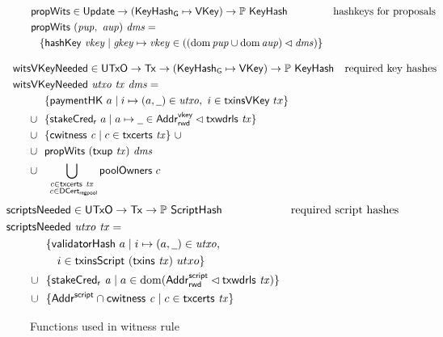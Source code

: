 \begin{figure}[htb]
  \begin{align*}
    & \mathsf{propWits} \in \mathsf{Update} \to (\mathsf{KeyHash_G}\mapsto\mathsf{VKey}) \to \mathbb{P}~\mathsf{KeyHash}
    & \text{hashkeys for proposals} \\
    & \mathsf{propWits}~(\mathit{pup},~\mathit{aup})~\mathit{dms} = \\
    & ~~\left\{
      \mathsf{hashKey}~ \mathit{vkey}
      \mid
      \mathit{gkey}\mapsto\mathit{vkey}\in
      \left(\left(\operatorname{dom}{\mathit{pup}}\cup\operatorname{dom}{\mathit{aup}}\right)\lhd\mathit{dms}\right)
      \right\}
  \end{align*}

    \begin{align*}
    & \hspace{-0.8cm}\fun{witsVKeyNeeded} \in \UTxO \to \Tx \to (\KeyHashGen\mapsto\VKey) \to
      \powerset{\KeyHash}
    & \text{required key hashes} \\
    &  \hspace{-0.8cm}\fun{witsVKeyNeeded}~\var{utxo}~\var{tx}~\var{dms} = \\
    & ~~\{ \fun{paymentHK}~a \mid i \mapsto (a, \wcard) \in \var{utxo},~i\in\fun{txinsVKey}~{tx} \} \\
    \cup & ~~
           \{\fun{stakeCred_r}~a\mid a\mapsto \wcard \in \AddrRWDVKey
      \restrictdom \txwdrls{tx}\}\\
    \cup & ~~\{\cwitness{c} \mid c \in \txcerts{tx}\}~\cup \\
    \cup & ~~\fun{propWits}~(\fun{txup}~\var{tx})~\var{dms} \\
    \cup & ~~\bigcup_{\substack{c \in \txcerts{tx} \\ ~c \in\DCertRegPool}} \fun{poolOwners}~{c}
  \end{align*}
  \begin{align*}
    & \hspace{-1cm}\fun{scriptsNeeded} \in \UTxO \to \Tx \to
      \powerset{\HashScr}
    & \text{required script hashes} \\
    &  \hspace{-1cm}\fun{scriptsNeeded}~\var{utxo}~\var{tx} = \\
    & ~~\{ \fun{validatorHash}~a \mid i \mapsto (a, \wcard) \in \var{utxo},\\
    & ~~~~~i\in\fun{txinsScript}~{(\fun{txins~\var{tx}})}~{utxo}\} \\
    \cup & ~~\{ \fun{stakeCred_{r}}~\var{a} \mid a \in \dom (\AddrRWDScr
           \restrictdom \fun{txwdrls}~\var{tx}) \} \\
    \cup & ~~\{\AddrScr \cap \fun{cwitness}~\var{c} \mid c \in \fun{txcerts}~\var{tx}\}
  \end{align*}
  \caption{Functions used in witness rule}
  \label{fig:functions-witnesses}
\end{figure}

